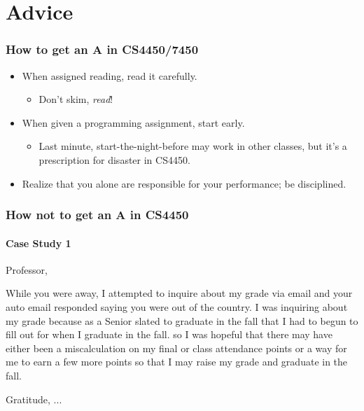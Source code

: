\documentclass{beamer}
\begin{document}
\section{Advice}

\begin{frame}[fragile]
    \frametitle{How to get an A in CS4450/7450}

\begin{itemize}

\item When assigned reading, read it carefully.
\begin{itemize}
\item Don't skim, \emph{read}!
\end{itemize}
\pause

\item When given a programming assignment, start early.
\begin{itemize}
\item Last minute, start-the-night-before may work in other classes, but it's a prescription for disaster in CS4450.
\end{itemize}
\pause 

\item Realize that you alone are responsible for your performance; be disciplined.

\end{itemize}
    
\end{frame}


\begin{frame}[fragile]
\frametitle{How not to get an A in CS4450}
\framesubtitle{Case Study 1}

Professor,

While you were away, I attempted to inquire about my grade via email and your auto email responded saying you were out of the country. I was inquiring about my grade because as a Senior slated to graduate in the fall {\color{blue}{I was hoping to earn an A- in your class after we had taken the final. I needed the A- for gpa purposes for job applications}} that I had to begun to fill out for when I graduate in the fall. {\color{brown}{I work in Dr. Kazic's Lab and she always speaks highly of you}} so I was hopeful that there may have either been a miscalculation on my final or class attendance points or a way for me to earn a few more points so that I may raise my grade and graduate in the fall.

{\color{red}{Is there any way for me to raise my grade a degree?}}

Gratitude,
    ...
\end{frame}
\end{document}
